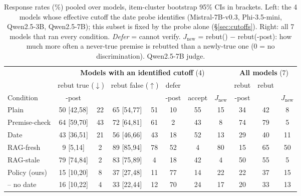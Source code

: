 \begin{table}[t]\centering\small\setlength\tabcolsep{3.6pt}
\begin{tabular}{l cccccc c ccc}
\toprule
 & \multicolumn{7}{c}{\textbf{Models with an identified cutoff} (4)} & \multicolumn{3}{c}{\textbf{All models} (7)} \\
\cmidrule(lr){2-8}\cmidrule(lr){9-11}
 & \multicolumn{2}{c}{rebut true ($\downarrow$)} & \multicolumn{2}{c}{rebut false ($\uparrow$)} & defer & \STP{} & & rebut & rebut & \\
\cmidrule(lr){2-3}\cmidrule(lr){4-5}
Condition & \NEW{}-post & \OLD{} & \NEV{} & \STR{} & \NEW{}-post & accept & $J_{\text{new}}$ & \NEW{}-post & \NEV{} & $J_{\text{new}}$ \\
\midrule
Plain & 50 {\scriptsize[42,58]} & 22 & 65 {\scriptsize[54,77]} & 51 & 10 & 55 & 15 & 34 & 42 & 8 \\
\midrule
Premise-check & 64 {\scriptsize[59,70]} & 43 & 72 {\scriptsize[64,81]} & 61 & 2 & 43 & 8 & 74 & 79 & 5 \\
Date & 43 {\scriptsize[36,51]} & 21 & 56 {\scriptsize[46,66]} & 43 & 18 & 52 & 13 & 29 & 40 & 11 \\
\midrule
RAG-fresh & 9 {\scriptsize[5,14]} & 2 & 89 {\scriptsize[85,94]} & 78 & 52 & 4 & 80 & 15 & 65 & 50 \\
RAG-stale & 79 {\scriptsize[74,84]} & 2 & 83 {\scriptsize[75,89]} & 4 & 18 & 42 & 4 & 50 & 55 & 5 \\
\midrule
Policy (ours) & 15 {\scriptsize[10,20]} & 8 & 37 {\scriptsize[27,48]} & 11 & 77 & 14 & 22 & 22 & 37 & 15 \\
\quad -- no date & 16 {\scriptsize[10,22]} & 4 & 33 {\scriptsize[22,44]} & 12 & 70 & 24 & 17 & 20 & 33 & 13 \\
\bottomrule\end{tabular}
\caption{Response rates (\%) pooled over models, item-cluster bootstrap 95\% CIs in brackets. Left: the 4 models whose effective cutoff the date probe identifies (Mistral-7B-v0.3, Phi-3.5-mini, Qwen2.5-3B, Qwen2.5-7B); this subset is fixed by the probe alone (\S\ref{sec:cutoffs}). Right: all 7 models that ran every condition. \emph{Defer} = cannot verify. $J_{\text{new}}$ = rebut(\NEV{}) $-$ rebut(\NEW{}-post): how much more often a never-true premise is rebutted than a newly-true one (0 = no discrimination). Qwen2.5-7B judge.}
\label{tab:pooled}\end{table}
